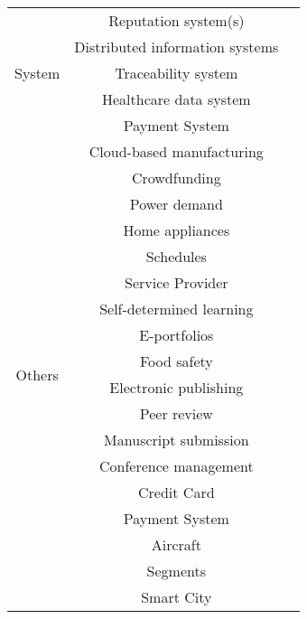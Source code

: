 \begin{longtable}{ |c|c|p{4cm}| }
	 \hline
	 \multirow{5}{*}{System} & Reputation system(s) & \cite{2015_Dennis,2016_Schaub} \\ \cline{2-3}
	 & Distributed information systems & \cite{2016_Azaria} \\ \cline{2-3}
	 & Traceability system & \cite{2016_Tian} \\ \cline{2-3}
	 & Healthcare data system & \cite{2016_Yue} \\ \cline{2-3}
	 & Payment System & \cite{2017_Jaag} \\
	 \hline
	 \multirow{18}{*}{Others} & Cloud-based manufacturing & \cite{2016_Bahga} \\ \cline{2-3}
	 & Crowdfunding & \cite{2016_Jacynycz} \\ \cline{2-3}
	 & Power demand & \multirow{3}{*}{\cite{2016_Kianmajd}} \\ \cline{2-2}
	 & Home appliances &  \\ \cline{2-2}
	 & Schedules &  \\ \cline{2-3}
	 & Service Provider & \cite{2016_Schaub} \\ \cline{2-3}
	 & Self-determined learning & \multirow{2}{*}{\cite{2016_Sharples}} \\ \cline{2-2}
	 & E-portfolios & \\ \cline{2-3}
	 & Food safety & \cite{2016_Tian} \\ \cline{2-3}
	 & Electronic publishing & \multirow{4}{*}{\cite{2017_Gipp}} \\ \cline{2-2}
	 & Peer review & \\ \cline{2-2}
	 & Manuscript   submission & \\ \cline{2-2}
	 & Conference management & \\ \cline{2-3}
	 & Credit Card & \multirow{2}{*}{\cite{2017_Jaag}} \\ \cline{2-2}
	 & Payment System & \\ \cline{2-3}
	 & Aircraft & \multirow{2}{*}{\cite{2017_Madhwal}} \\ \cline{2-2}
	 & Segments &  \\ \cline{2-3}
	 & Smart City & \cite{2018_Alessandra} \\
	 \hline
\end{longtable}

